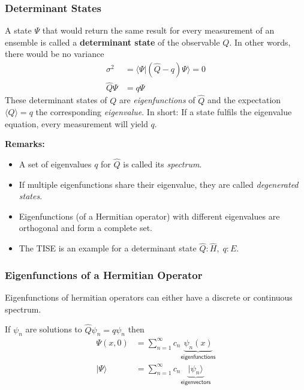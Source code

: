 \subsubsection{Determinant States}
A state $\Psi$ that would return the same result for every measurement of an ensemble is called a \textbf{determinant state} of the observable $Q$.
In other words, there would be no variance
\noindent\begin{align*}
    \sigma^2     & = \langle \Psi|(\hat{Q} - q) \Psi\rangle = 0 \\
    \hat{Q} \Psi & = q \Psi
\end{align*}
These determinant states of $Q$ are \textit{eigenfunctions} of $\hat{Q}$ and the expectation $\langle Q\rangle = q$ the corresponding \textit{eigenvalue}.
\newpar{}
In short: If a state fulfils the eigenvalue equation, every measurement will yield $q$.

\textbf{Remarks:}
\begin{itemize}
    \item A set of eigenvalues $q$ for $\hat{Q}$ is called its \textit{spectrum}.
    \item If multiple eigenfunctions share their eigenvalue, they are called \textit{degenerated states}.
    \item Eigenfunctions (of a Hermitian operator) with different eigenvalues are orthogonal and form a complete set.
    \item The TISE is an example for a determinant state\newline
          $\hat{Q}: \hat{H},\; q:E$.
\end{itemize}

\subsubsection{Eigenfunctions of a Hermitian Operator}
Eigenfunctions of hermitian operators can either have a discrete or continuous spectrum.

\newpar{}

If $\psi_n$ are solutions to $\hat{Q}\psi_n=q\psi_n$ then
\noindent\begin{align*}
    \Psi(x,0)    & = \sum_{n=1}^{\infty} c_n \underbrace{\psi_n(x)}_{\textsf{eigenfunctions}}    \\
    |\Psi\rangle & = \sum_{n=1}^{\infty} c_n \underbrace{|\psi_n\rangle}_{\textsf{eigenvectors}}
\end{align*}

